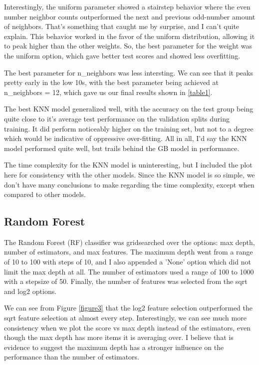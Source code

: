 \documentclass[12pt]{article}
\begin{document}
Interestingly, the uniform parameter showed a stairstep behavior where the even number neighbor counts outperformed
the next and previous odd-number amount of neighbors. That's something that caught me by surprise, and I can't quite explain.
This behavior worked in the favor of the uniform distribution, allowing it to peak higher than the other weights. So, 
the best parameter for the weight was the uniform option, which gave better test scores and showed less overfitting.

The best parameter for n\_neighbors was less intersting. We can see that it peaks pretty early in the low 10s, with 
the best parameter being achieved at n\_neighbors = 12, which gave us our final results shown in \ref{table1}.

The best KNN model generalized well, with the accuracy on the test group being quite close to it's average test performance on the 
validation splits during training. It did perform noticeably higher on the training set, but not to a degree which would 
be indicative of oppressive over-fitting. All in all, I'd say the KNN model performed quite well, but trails behind the 
GB model in performance.

The time complexity for the KNN model is uninteresting, but I included the plot here for consistency with the other models. 
Since the KNN model is so simple, we don't have many conclusions to make regarding the time complexity, except when compared 
to other models.


\subsection{Random Forest}
The Random Forest (RF) classifier was gridsearched over the options: max depth, number of estimators, and max features.
The maximum depth went from a range of 10 to 100 with steps of 10, and I also appended a 'None' option which did not 
limit the max depth at all. The number of estimators used a range of 100 to 1000 with a stepsize of 50. Finally, 
the number of features was selected from the sqrt and log2 options.

We can see from Figure \ref{figure3} that the log2 feature selection outperformed the sqrt feature selection at almost
every step. Interestingly, we can see much more consistency when we plot the score vs max depth instead of the estimators,
even though the max depth has more items it is averaging over.  I believe that is evidence to suggest the maximum depth 
has a stronger influence on the performance than the number of estimators.
\end{document}
